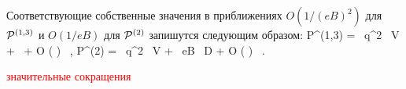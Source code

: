 Соответствующие собственные значения в приближениях $O(1/(eB)^2)$ для ${\cal P}^{(1,3)}$ и
$O(1/eB)$ для ${\cal P}^{(2)}$ запишутся следующим образом:
\beq
\label{eq:kappa13}
{\cal P}^{(1,3)} = \frac{\alpha}{3\pi} \, q^2 \, {\cal V} + 
\frac{\alpha}{6\pi} \,   
+ O \left ( \right)  \, ,
\eeq
%
\beq
\label{eq:kappa2}
{\cal P}^{(2)} = \frac{\alpha}{3\pi} \, q^2 \, {\cal V} + \frac{2 \alpha}{\pi} \, eB \, {\cal D}  + 
 O \left ( \right) \, .
\eeq

\textcolor{red}{значительные сокращения}
%


